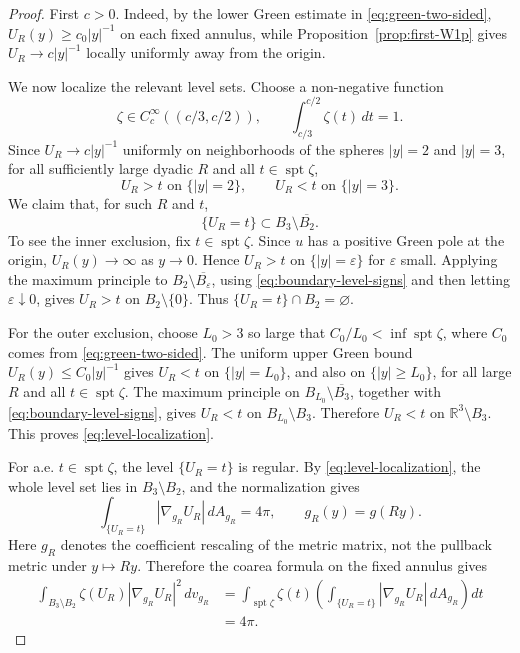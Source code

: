 \documentclass[11pt]{amsart}
\numberwithin{equation}{section}
\theoremstyle{definition}
\newcommand{\R}{\mathbb R}
\newcommand{\spt}{\operatorname{spt}}
\newcommand{\abs}[1]{\left\lvert #1\right\rvert}
\begin{document}
\begin{proof}
First $c>0$.  Indeed, by the lower Green estimate in \eqref{eq:green-two-sided}, $U_R(y)\ge c_0\abs y^{-1}$ on each fixed annulus, while Proposition~\ref{prop:first-W1p} gives $U_R\to c\abs y^{-1}$ locally uniformly away from the origin.

We now localize the relevant level sets.  Choose a non-negative function
$$
        \zeta\in C_c^\infty((c/3,c/2)),\qquad \int_{c/3}^{c/2}\zeta(t)\,dt=1.
$$
Since $U_R\to c\abs y^{-1}$ uniformly on neighborhoods of the spheres $\abs y=2$ and $\abs y=3$, for all sufficiently large dyadic $R$ and all $t\in\spt\zeta$,
\begin{equation}\label{eq:boundary-level-signs}
        U_R>t \text{ on }\{\abs y=2\},\qquad
        U_R<t \text{ on }\{\abs y=3\}.
\end{equation}
We claim that, for such $R$ and $t$,
\begin{equation}\label{eq:level-localization}
        \{U_R=t\}\subset B_3\setminus \overline{B_2}.
\end{equation}
To see the inner exclusion, fix $t\in\spt\zeta$.  Since $u$ has a positive Green pole at the origin, $U_R(y)\to\infty$ as $y\to0$.  Hence $U_R>t$ on $\{\abs y=\varepsilon\}$ for $\varepsilon$ small.  Applying the maximum principle to $B_2\setminus \overline{B_\varepsilon}$, using \eqref{eq:boundary-level-signs} and then letting $\varepsilon\downarrow0$, gives $U_R>t$ on $B_2\setminus\{0\}$.  Thus $\{U_R=t\}\cap B_2=\varnothing$.

For the outer exclusion, choose $L_0>3$ so large that $C_0/L_0<\inf\spt\zeta$, where $C_0$ comes from \eqref{eq:green-two-sided}.  The uniform upper Green bound $U_R(y)\le C_0\abs y^{-1}$ gives $U_R<t$ on $\{\abs y=L_0\}$, and also on $\{\abs y\ge L_0\}$, for all large $R$ and all $t\in\spt\zeta$.  The maximum principle on $B_{L_0}\setminus\overline{B_3}$, together with \eqref{eq:boundary-level-signs}, gives $U_R<t$ on $B_{L_0}\setminus B_3$.  Therefore $U_R<t$ on $\R^3\setminus B_3$.  This proves \eqref{eq:level-localization}.

For a.e. $t\in\spt\zeta$, the level $\{U_R=t\}$ is regular.  By \eqref{eq:level-localization}, the whole level set lies in $B_3\setminus B_2$, and the normalization gives
$$
        \int_{\{U_R=t\}}\abs{\nabla_{g_R}U_R}\,dA_{g_R}=4\pi,
        \qquad g_R(y)=g(Ry).
$$
Here $g_R$ denotes the coefficient rescaling of the metric matrix, not the pullback metric under $y\mapsto Ry$.  Therefore the coarea formula on the fixed annulus gives
\begin{equation}\label{eq:c-coarea-normalization}
\begin{aligned}
        \int_{B_3\setminus B_2}
        \zeta(U_R)\abs{\nabla_{g_R}U_R}^2\,dv_{g_R}
        &=\int_{\spt\zeta}
        \zeta(t)
        \left(\int_{\{U_R=t\}}\abs{\nabla_{g_R}U_R}\,dA_{g_R}\right)dt  \\
        &=4\pi.
\end{aligned}
\end{equation}



\end{proof}
\end{document}
